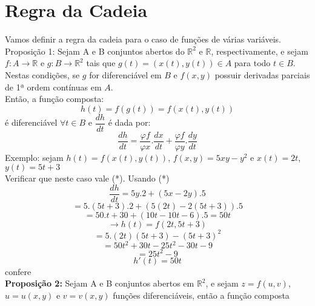 \documentclass{article}
\begin{document}
	\section{Regra da Cadeia}
		Vamos definir a regra da cadeia para o caso de funções de várias variáveis.\\
		Proposição 1: Sejam A e B conjuntos abertos do $\mathbb{R}^2$ e $\mathbb{R}$, respectivamente, e sejam $f:A \to \mathbb{R}$ e $g:B \to \mathbb{R}^2$ tais que $g(t) = (x(t),y(t)) \in A$ para todo $t \in B$. Nestas condições, se $g$ for diferenciável em $B$ e $f(x,y)$ possuir derivadas parciais de 1ª ordem contínuas em $A$.\\
		Então, a função composta:\\
			$$h(t)= f(g(t))=f(x(t),y(t))$$
		é diferenciável $\forall t \in B$ e $\dfrac{dh}{dt}$ é dada por:
			$$\dfrac{dh}{dt} = \dfrac{\varphi f}{\varphi x}. \dfrac{dx}{dt}+\dfrac{\varphi f}{\varphi y}.\dfrac{dy}{dt}$$
		Exemplo: sejam $h(t)=f(x(t),y(t))$, $f(x,y)=5xy-y^2$ e $x(t) = 2t$, $y(t)=5t+3$\\
		Verificar que neste caso vale (*). Usando (*)\\
		$$\dfrac{dh}{dt} = 5y.2+(5x-2y).5$$
		$$=5.(5t+3).2+(5(2t)-2(5t+3)).5$$
		$$=50.t+30+(10t-10t-6).5 = 50t$$
		$$\to h(t) = f(2t,5t+3)$$
		$$=5.(2t)(5t+3)-(5t+3)^2$$
		$$=50t^2+30t-25t^2-30t-9$$
		$$= 25t^2-9$$
		$$h'(t) = 50t$$
		confere\\
		\textbf{Proposição 2:} Sejam A e B conjuntos abertos em $\mathbb{R}^2$, e sejam $z=f(u,v)$, $u=u(x,y)$ e $v=v(x,y)$ funções diferenciáveis, então a função composta
		
\end{document}
